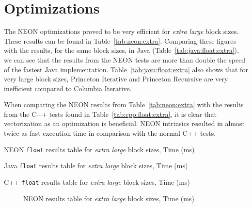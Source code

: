 \section{Optimizations}
The NEON optimizations proved to be very efficient for \emph{extra large} block sizes. These results can be found in Table~\ref{tab:neon:extra}. Comparing these figures with the results, for the same block sizes, in Java (Table~\ref{tab:java:float:extra}), we can see that the results from the NEON tests are more than double the speed of the fastest Java implementation. Table~\ref{tab:java:float:extra} also shows that for very large block sizes, Princeton Iterative and Princeton Recursive are very inefficient compared to Columbia Iterative.

When comparing the NEON results from Table~\ref{tab:neon:extra} with the results from the C++ tests found in Table~\ref{tab:cpp:float:extra}, it is clear that vectorization as an optimization is beneficial. NEON intrinsics resulted in almost twice as fast execution time in comparison with the normal C++ tests.

\begin{table}
    \centering
    \caption{NEON \texttt{float} results table for \emph{extra large} block sizes, Time (ms)}
    \label{tab:neon:extra}
    
\end{table}

\begin{table}
    \centering
    \caption{Java \texttt{float} results table for \emph{extra large} block sizes, Time (ms)}
    \label{tab:java:float:extra}
    
\end{table}

\begin{table}
    \centering
    \caption{C++ \texttt{float} results table for \emph{extra large} block sizes, Time (ms)}
    \label{tab:cpp:float:extra}
    \resizebox{\columnwidth}{!}{
        
    }
\end{table}

\begin{figure}
    \centering
    
    \caption{NEON results table for \emph{extra large} block sizes, Time (ms)}
    \label{fig:neon:line:extra}
\end{figure}


%     
